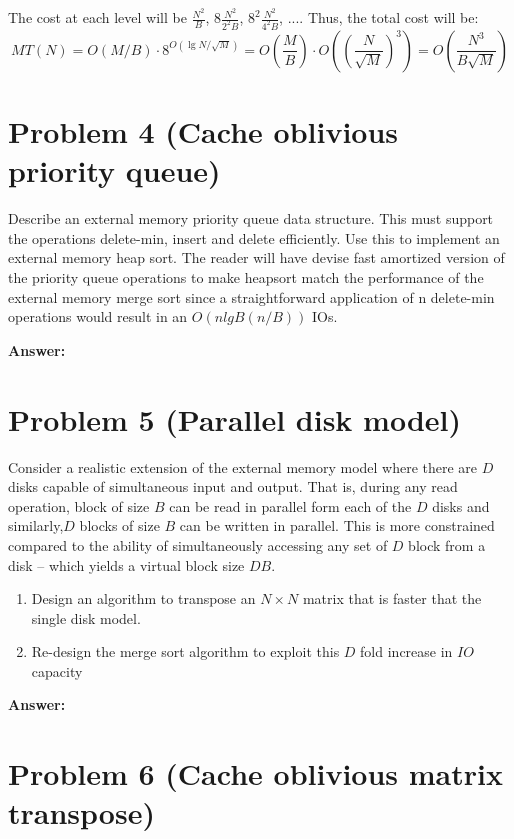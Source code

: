 \documentclass{article}
\begin{document}
\bigbreak
The cost at each level will be $\frac{N^2}{B}$, $8\frac{N^2}{2^2B}$, $8^2\frac{N^2}{4^2B}$, .... Thus, the total cost will be:
$$MT(N)=O(M/B)\cdot8^{O(\lg N/ \sqrt{M})} = O\left(\frac{M}{B}\right)\cdot O\left(\left(\frac{N}{\sqrt{M}}\right)^3\right) = O \left(\frac{N^3}{B\sqrt{M}}\right)$$

\section*{Problem 4 (Cache oblivious priority queue)}

Describe an external memory priority queue data structure. This must support the operations delete-min, insert and delete efficiently. Use this to implement an external memory heap sort. The reader will have devise fast amortized version of the priority queue operations to make heapsort match the performance of the external memory merge sort since a straightforward application of n delete-min operations would result in an $O(n lgB(n/B))$ IOs.

\textbf{Answer:}




\section*{Problem 5 (Parallel disk model)}

Consider  a  realistic  extension  of  the  external  memory  model  where  there  are $D$ disks capable of simultaneous input and output.  That is, during any read operation, block of size $B$ can be read in parallel form each of the $D$ disks and similarly,$D$ blocks of size $B$ can be written in parallel.  This is more constrained compared to the ability of simultaneously accessing any set of $D$ block from a disk – which yields a virtual block size $DB$.

\begin{enumerate}
    \item Design an algorithm to transpose an $N\times N$ matrix that is faster that the single disk model.
    \item  Re-design the merge sort algorithm to exploit this $D$ fold increase in $IO$ capacity
\end{enumerate}

\textbf{Answer:}

\section*{Problem 6 (Cache oblivious matrix transpose)}
\end{document}
